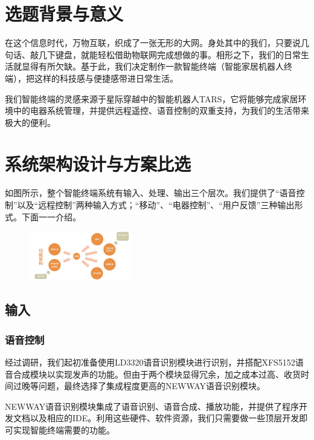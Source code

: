 \section{选题背景与意义}
    \hspace{1.5em}在这个信息时代，万物互联，织成了一张无形的大网。身处其中的我们，只要说几句话、敲几下键盘，就能轻松借助物联网完成想做的事。相形之下，我们的日常生活就显得有所欠缺。基于此，我们决定制作一款智能终端（智能家居机器人终端），把这样的科技感与便捷感带进日常生活。

    \hspace{1.5em}我们智能终端的灵感来源于星际穿越中的智能机器人TARS，它将能够完成家居环境中的电器系统管理，并提供远程遥控、语音控制的双重支持，为我们的生活带来极大的便利。

\section{系统架构设计与方案比选}
    \hspace{1.5em}如图所示，整个智能终端系统有输入、处理、输出三个层次。我们提供了“语音控制”以及“远程控制”两种输入方式；“移动”、“电器控制”、“用户反馈”三种输出形式。下面一一介绍。
    \begin{figure}[H]
        \centering
        \includegraphics[width=0.4\textwidth]{./img/Structure.jpg}
    \end{figure}
    \subsection{输入}
    \subsubsection{语音控制}
    \hspace{1.5em}经过调研，我们起初准备使用LD3320语音识别模块进行识别，并搭配XFS5152语音合成模块以实现发声的功能。但由于两个模块显得冗余，加之成本过高、收货时间过晚等问题，最终选择了集成程度更高的NEWWAY语音识别模块。

    \hspace{1.5em}NEWWAY语音识别模块集成了语音识别、语音合成、播放功能，并提供了程序开发文档以及相应的IDE。利用这些硬件、软件资源，我们只需要做一些顶层开发即可实现智能终端需要的功能。

